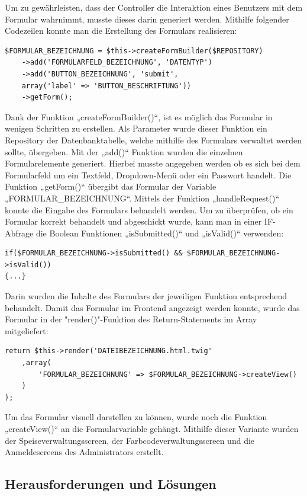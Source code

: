 Um zu gewährleisten, dass der Controller die Interaktion eines Benutzers mit dem Formular wahrnimmt, musste dieses darin generiert werden. Mithilfe folgender Codezeilen konnte man die Erstellung des Formulars realisieren:
	\lstset{language=php}
  	\begin{lstlisting}
$FORMULAR_BEZEICHNUNG = $this->createFormBuilder($REPOSITORY)
	->add('FORMULARFELD_BEZEICHNUNG', 'DATENTYP')
	->add('BUTTON_BEZEICHNUNG', 'submit', 
	array('label' => 'BUTTON_BESCHRIFTUNG'))
    ->getForm();
  	\end{lstlisting}
Dank der Funktion „createFormBuilder()“, ist es möglich das Formular in wenigen Schritten zu erstellen. Als Parameter wurde dieser Funktion ein Repository der Datenbanktabelle, welche mithilfe des Formulars verwaltet werden sollte, übergeben. Mit der „add()“ Funktion wurden die einzelnen Formularelemente generiert. Hierbei musste angegeben werden ob es sich bei dem Formularfeld um ein Textfeld, Dropdown-Menü oder ein Passwort handelt. Die Funktion „getForm()“ übergibt das Formular der Variable „FORMULAR\_BEZEICHNUNG“.
Mittels der Funktion „handleRequest()“ konnte die Eingabe des Formulars behandelt werden. Um zu überprüfen, ob ein Formular korrekt behandelt und abgeschickt wurde, kann man in einer IF-Abfrage die Boolean Funktionen „isSubmitted()“ und „isValid()“ verwenden:
	\lstset{language=php}
  	\begin{lstlisting}
if($FORMULAR_BEZEICHNUNG->isSubmitted() && $FORMULAR_BEZEICHNUNG->isValid())
{...}
  	\end{lstlisting}
Darin wurden die Inhalte des Formulars der jeweiligen Funktion entsprechend behandelt.
Damit das Formular im Frontend angezeigt werden konnte, wurde das Formular in der "render()"-Funktion des Return-Statements im Array mitgeliefert:
	\lstset{language=php}
  	\begin{lstlisting}
return $this->render('DATEIBEZEICHNUNG.html.twig'
    ,array(
    	'FORMULAR_BEZEICHNUNG' => $FORMULAR_BEZEICHNUNG->createView()
    )
);
  	\end{lstlisting}
Um das Formular visuell darstellen zu können, wurde noch die Funktion „createView()“ an die Formularvariable gehängt.
Mithilfe dieser Variante wurden der Speiseverwaltungsscreen, der Farbcodeverwaltungsscreen und die Anmeldescreens des Administrators erstellt.

  \subsection{Herausforderungen und Lösungen}

